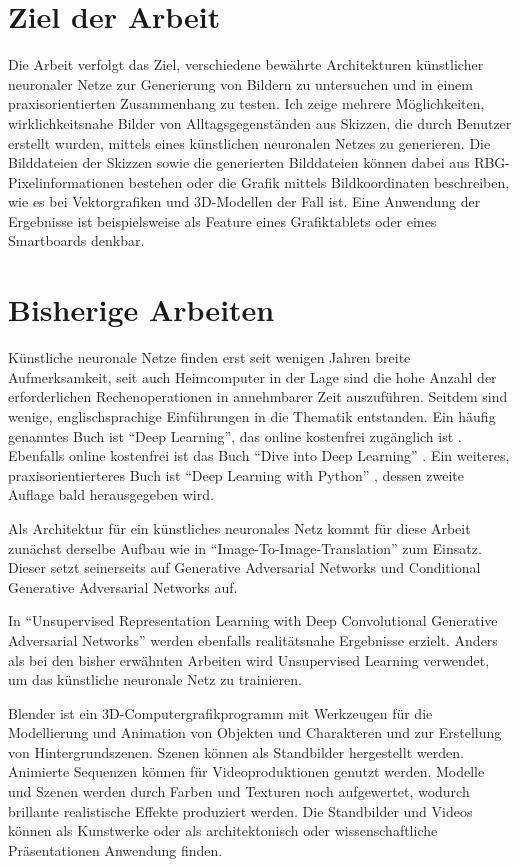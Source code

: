 \section{Ziel der Arbeit}
\label{sec:ziel}
Die Arbeit verfolgt das Ziel, verschiedene bewährte Architekturen künstlicher
neuronaler Netze zur Generierung von Bildern zu untersuchen und in einem
praxisorientierten Zusammenhang zu testen. Ich zeige mehrere Möglichkeiten,
wirklichkeitsnahe Bilder von Alltagsgegenständen aus Skizzen, die durch Benutzer
erstellt wurden, mittels eines künstlichen neuronalen Netzes zu generieren. Die
Bilddateien der Skizzen sowie die generierten Bilddateien können dabei aus
RBG-Pixelinformationen bestehen oder die Grafik mittels Bildkoordinaten beschreiben,
wie es bei Vektorgrafiken und 3D-Modellen der Fall ist. Eine Anwendung der
Ergebnisse ist beispielsweise als Feature eines Grafiktablets oder eines
Smartboards denkbar.

\section{Bisherige Arbeiten}
\label{sec:related}
Künstliche neuronale Netze finden erst seit wenigen Jahren breite Aufmerksamkeit,
seit auch Heimcomputer in der Lage sind die hohe Anzahl der erforderlichen
Rechenoperationen in annehmbarer Zeit auszuführen. Seitdem sind wenige,
englischsprachige Einführungen in die Thematik entstanden. Ein häufig genanntes
Buch ist ``Deep Learning'', das online kostenfrei zugänglich ist \cite{Goodfellow-et-al-2016}.
Ebenfalls online kostenfrei ist das Buch ``Dive into Deep Learning'' \cite{zhang2020dive}.
Ein weiteres, praxisorientierteres Buch ist ``Deep Learning with Python'' \cite{chollet2017}, dessen
zweite Auflage bald herausgegeben wird.

Als Architektur für ein künstliches neuronales Netz kommt für diese Arbeit
zunächst derselbe Aufbau wie in ``Image-To-Image-Translation'' \cite{isola2018imagetoimage} zum Einsatz. Dieser setzt seinerseits auf Generative
Adversarial Networks \cite{goodfellow2014generative} und Conditional Generative Adversarial Networks \cite{mirza2014conditional} auf.

In ``Unsupervised Representation Learning with Deep Convolutional Generative Adversarial Networks'' \cite{radford2016unsupervised} werden ebenfalls
realitätsnahe Ergebnisse erzielt. Anders als bei den bisher erwähnten Arbeiten
wird Unsupervised Learning verwendet, um das künstliche neuronale Netz zu trainieren.

Blender ist ein 3D-Computergrafikprogramm mit Werkzeugen für die Modellierung und Animation von Objekten und Charakteren und zur Erstellung von Hintergrundszenen. Szenen können als Standbilder hergestellt werden. Animierte Sequenzen können für Videoproduktionen genutzt werden. Modelle und Szenen werden durch Farben und Texturen noch aufgewertet, wodurch brillante realistische Effekte produziert werden. Die Standbilder und Videos können als Kunstwerke oder als architektonisch oder wissenschaftliche Präsentationen Anwendung finden. \cite{blain2020blender}
